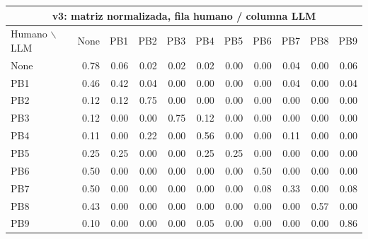 \begin{center}
\tiny
\setlength{\tabcolsep}{2.4pt}
\renewcommand{\arraystretch}{1.05}
\begin{tabular}{lrrrrrrrrrr}
\toprule
\multicolumn{11}{c}{\textbf{v3: matriz normalizada, fila humano / columna LLM}} \\
\midrule
Humano $\backslash$ LLM & None & PB1 & PB2 & PB3 & PB4 & PB5 & PB6 & PB7 & PB8 & PB9 \\
\midrule
None & 0.78 & 0.06 & 0.02 & 0.02 & 0.02 & 0.00 & 0.00 & 0.04 & 0.00 & 0.06 \\
PB1  & 0.46 & 0.42 & 0.04 & 0.00 & 0.00 & 0.00 & 0.00 & 0.04 & 0.00 & 0.04 \\
PB2  & 0.12 & 0.12 & 0.75 & 0.00 & 0.00 & 0.00 & 0.00 & 0.00 & 0.00 & 0.00 \\
PB3  & 0.12 & 0.00 & 0.00 & 0.75 & 0.12 & 0.00 & 0.00 & 0.00 & 0.00 & 0.00 \\
PB4  & 0.11 & 0.00 & 0.22 & 0.00 & 0.56 & 0.00 & 0.00 & 0.11 & 0.00 & 0.00 \\
PB5  & 0.25 & 0.25 & 0.00 & 0.00 & 0.25 & 0.25 & 0.00 & 0.00 & 0.00 & 0.00 \\
PB6  & 0.50 & 0.00 & 0.00 & 0.00 & 0.00 & 0.00 & 0.50 & 0.00 & 0.00 & 0.00 \\
PB7  & 0.50 & 0.00 & 0.00 & 0.00 & 0.00 & 0.00 & 0.08 & 0.33 & 0.00 & 0.08 \\
PB8  & 0.43 & 0.00 & 0.00 & 0.00 & 0.00 & 0.00 & 0.00 & 0.00 & 0.57 & 0.00 \\
PB9  & 0.10 & 0.00 & 0.00 & 0.00 & 0.05 & 0.00 & 0.00 & 0.00 & 0.00 & 0.86 \\
\bottomrule
\end{tabular}
\end{center}

